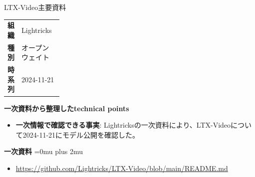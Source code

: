 \begin{technicalnote}{LTX-Video}{主要資料}
\begingroup
\begin{tabularx}{\linewidth}{@{}>{\bfseries}p{0.22\linewidth}X@{}}
組織 & Lightricks \\
種別 & オープンウェイト \\
時系列 & 2024-11-21 \\
\end{tabularx}
\smallskip
{\bfseries 一次資料から整理したtechnical points}
\begin{itemize}[leftmargin=1.5em,itemsep=0.35em]
\item \textbf{一次情報で確認できる事実}: Lightricksの一次資料により、LTX-Videoについて2024-11-21にモデル公開を確認した。
\end{itemize}
\begin{minipage}{\linewidth}
\begin{samepage}
{\bfseries 一次資料}
\begingroup\sloppy
\Urlmuskip=0mu plus 2mu\relax
\begin{itemize}[leftmargin=1.5em,itemsep=0.25em]
\item {\scriptsize\url{https://github.com/Lightricks/LTX-Video/blob/main/README.md}}
\end{itemize}
\endgroup
\end{samepage}
\end{minipage}
\endgroup
\end{technicalnote}
\medskip

